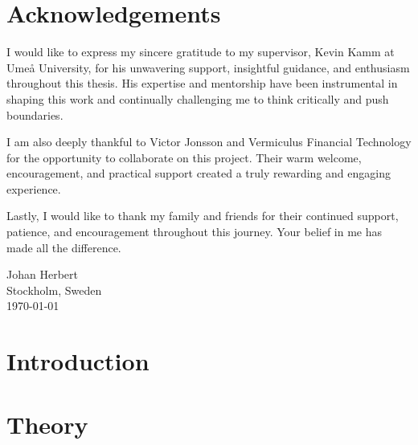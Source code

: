 \documentclass[%
a4paper,							
11pt,								
bibliography=totoc,						
abstracton=true					
]
{scrartcl}
\theoremstyle{plain}
\theoremstyle{definition}
\theoremstyle{remark}
\newcommand{\1}{\mathbbm{1}}
\begin{document}
\section*{Acknowledgements}
I would like to express my sincere gratitude to my supervisor, Kevin Kamm at Umeå University, for his unwavering support, insightful guidance, and enthusiasm throughout this thesis. His expertise and mentorship have been instrumental in shaping this work and continually challenging me to think critically and push boundaries.

I am also deeply thankful to Victor Jonsson and Vermiculus Financial Technology for the opportunity to collaborate on this project. Their warm welcome, encouragement, and practical support created a truly rewarding and engaging experience.

Lastly, I would like to thank my family and friends for their continued support, patience, and encouragement throughout this journey. Your belief in me has made all the difference.

Johan Herbert\\
Stockholm, Sweden\\
\today 

\newpage
\clearpage
\newpage
{\hypersetup{linkcolor=black}
\tableofcontents
}
\newpage
{}
\pagestyle{scrheadings}



\section{Introduction}\label{sec:Introduction}



\section{Theory}\label{sec:theory}

\end{document}
